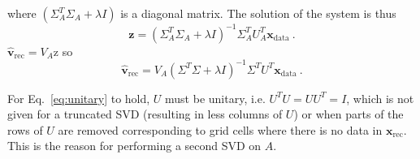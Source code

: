 \documentclass[a4paper]{article}
\begin{document}
where $(\Sigma_A^T \Sigma_A + \lambda I)$ is a diagonal matrix. The solution of the system is thus
\begin{equation}
    \mathbf{z} = (\Sigma_A^T \Sigma_A + \lambda I)^{-1} \Sigma_A^T U_A^T \mathbf{x}_\mathrm{data}~.
\end{equation}
$\hat{\mathbf{v}}_\mathrm{rec} = V_A \mathrm{z}$ so 
\begin{equation}
    \hat{\mathbf{v}}_\mathrm{rec} = V_A (\Sigma^T \Sigma + \lambda I)^{-1} \Sigma^T U^T \mathbf{x}_\mathrm{data}~.
\end{equation}

For Eq.~\eqref{eq:unitary} to hold, $U$ must be unitary, i.e. $U^TU = U U^T = I$, which is not given for a truncated SVD (resulting in less columns of $U$) or when parts of the rows of $U$ are removed corresponding to grid cells where there is no data in $\mathbf{x}_\mathrm{rec}$. This is the reason for performing a second SVD on $A$.
\end{document}
